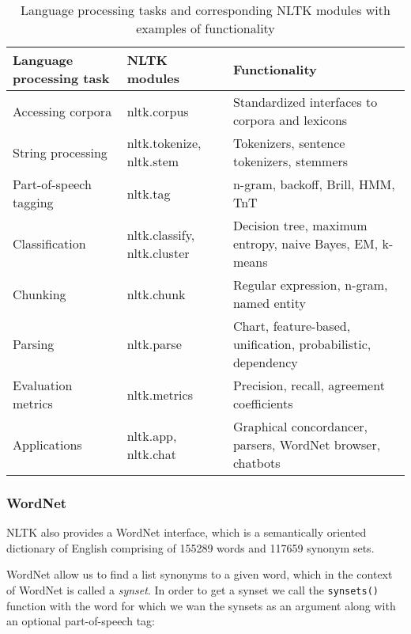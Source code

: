 \begin{table}[!htb]
\caption[NLTK modules]{Language processing tasks and corresponding NLTK modules with examples of
functionality\cite{nltk_ps}}\label{tab:nltk_modules}

\begin{tabularx}{\linewidth}{XXX}
\textbf{Language processing task} & \textbf{NLTK modules}       & \textbf{Functionality}                                       \\ \hline
Accessing corpora                 & nltk.corpus                 & Standardized interfaces to corpora and lexicons              \\
String processing                 & nltk.tokenize, nltk.stem    & Tokenizers, sentence tokenizers, stemmers                    \\
Part-of-speech tagging            & nltk.tag                    & n-gram, backoff, Brill, HMM, TnT                             \\
Classification                    & nltk.classify, nltk.cluster & Decision tree, maximum entropy, naive Bayes, EM, k-means     \\
Chunking                          & nltk.chunk                  & Regular expression, n-gram, named entity                     \\
Parsing                           & nltk.parse                  & Chart, feature-based, unification, probabilistic, dependency \\
Evaluation metrics                & nltk.metrics                & Precision, recall, agreement coefficients                    \\
Applications                      & nltk.app, nltk.chat         & Graphical concordancer, parsers, WordNet browser, chatbots   
                     
\end{tabularx}

\end{table}
\subsubsection{WordNet}
NLTK also provides a WordNet interface, which is a semantically oriented dictionary of English comprising of 155289 words and 117659 synonym sets\cite{wordnet_counts}.

WordNet allow us to find a list synonyms to a given word, which in the context of WordNet is called a \textit{synset}. In order to get a synset we call the \texttt{synsets()} function with the word for which we wan the synsets as an argument along with an optional part-of-speech tag:

